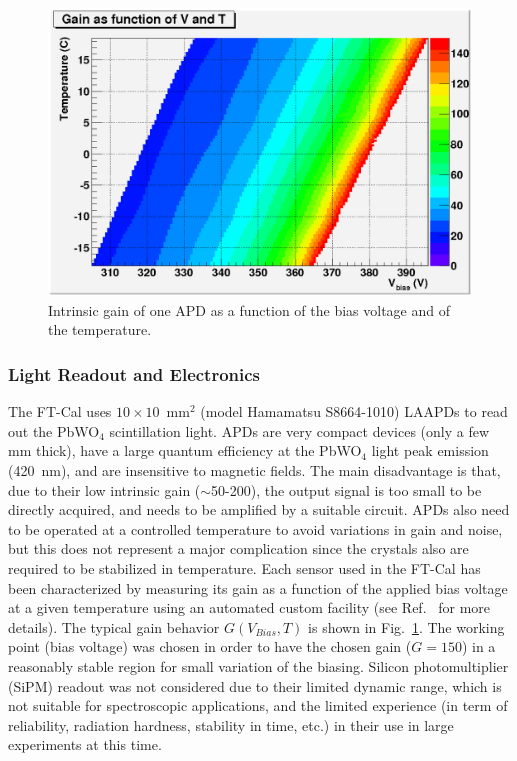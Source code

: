 \begin{figure}[th!]
\centering 
\includegraphics[width=1.0\columnwidth]{./fig/apd5.eps} 
\caption{Intrinsic gain of one APD as a function of the bias voltage and of the temperature.}
\label{fig:G-V-T} 
\end{figure}

\subsubsection{Light Readout and Electronics}
\label{sec:ftcalread}

The FT-Cal uses $10 \times 10$~mm$^2$ (model Hamamatsu S8664-1010) LAAPDs to read out the PbWO$_4$
scintillation light. APDs are very compact devices (only a few mm thick), have a large quantum efficiency at the
PbWO$_4$ light peak emission (420~nm), and  are insensitive to magnetic fields. The main disadvantage is that,
due to their low intrinsic gain ($\sim$50-200), the output signal is too small to be directly acquired, and needs to
be amplified by a suitable circuit. APDs also need to be operated at a controlled temperature to avoid variations in
gain and noise, but this does not represent a major complication since the crystals also are required to be stabilized
in temperature. Each sensor used in the FT-Cal has been characterized by measuring its gain as a function of the
applied bias voltage at a given temperature using an automated  custom facility (see Ref.~\cite{celeAPD} for more
details). The typical gain behavior $G(V_{Bias},T)$ is shown in Fig.~\ref{fig:G-V-T}. The working point (bias voltage)
was chosen in order to have the chosen gain ($G=150$) in a reasonably stable region for small variation of the biasing.
Silicon photomultiplier (SiPM) readout was not considered due to their limited dynamic range, which is not suitable for
spectroscopic applications, and the limited experience (in term of reliability, radiation hardness, stability in time, etc.)
in their use in large experiments at this time.

